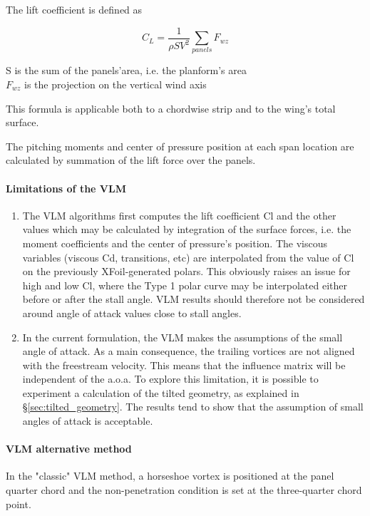 \documentclass[a4paper,twoside,12pt,dvips]{article}
\begin{document}
The lift coefficient is defined as 

\[C_L = \frac{1}{\rho S V^2} \underset{panels}\sum{F_{wz}}\]

S is the sum of the panels'area, i.e. the planform's area\\
$F_{wz}$ is the projection on the vertical wind axis

This formula is applicable both to a chordwise strip and to the wing's
total surface.

The pitching moments and center of pressure position at each span
location are calculated by summation of the lift force over the
panels.

\paragraph{Limitations of the VLM}

\begin{enumerate}
\item The VLM algorithms first computes the lift coefficient Cl and
the other values which may be calculated by integration of the surface
forces, i.e. the moment coefficients and the center of pressure's
position. The viscous variables (viscous Cd, transitions, etc) are
interpolated from the value of Cl on the previously XFoil-generated
polars. This obviously raises an issue for high and low Cl, where the
Type 1 polar curve may be interpolated either before or after the
stall angle.\newline
VLM results should therefore not be considered around angle of attack
values close to stall angles.
\item In the current formulation, the VLM makes the assumptions of the
small angle of attack. As a main consequence, the trailing vortices
are not aligned with the freestream velocity. This means that the
influence matrix will be independent of the a.o.a.\newline
To explore this limitation, it is possible to experiment a calculation
of the tilted geometry, as explained in
\S\ref{sec:tilted_geometry}. The results tend to show that the
assumption of small angles of attack is acceptable.
\end{enumerate}

\paragraph{VLM alternative method}

In the "classic" VLM method, a horseshoe vortex is positioned at the
panel quarter chord and the non-penetration condition is set at the
three-quarter chord point.
\end{document}

